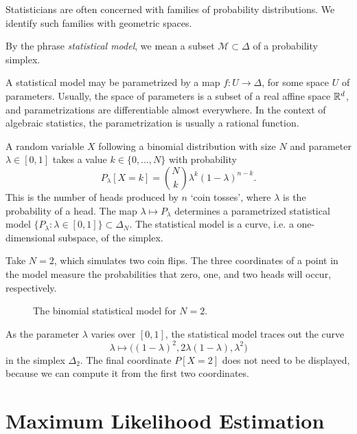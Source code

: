 \documentclass[cclicense]{hmcthesis}
\newcommand*{\Mod}{\mathcal{M}}
\numberwithin{equation}{section}
\begin{document}
    Statisticians are often concerned with families of probability
    distributions.  We identify such families with geometric spaces.
    \begin{definition}
    By the phrase \emph{statistical model}, we mean a subset $\Mod \subset
    \Delta$ of a probability simplex.
    \end{definition}
    \noindent A statistical model may be parametrized by a map $f: U \to
    \Delta$, for some space $U$ of parameters.  Usually, the space of parameters
    is a subset of a real affine space $\mathbb{R}^d$, and parametrizations are
    differentiable almost everywhere.  In the context of algebraic statistics,
    the parametrization is usually a rational function.
    \begin{example}
    A random variable $X$ following a binomial distribution with size $N$ and
    parameter $\lambda \in [0,1]$ takes a value $k \in \{0,\ldots, N\}$ with
    probability
    \[
        P_\lambda[X = k] = {N \choose k} \lambda^k(1-\lambda)^{n-k}.
    \]
    This is the number of heads produced by $n$ `coin tosses', where $\lambda$
    is the probability of a head.  The map $\lambda \mapsto P_\lambda$
    determines a parametrized statistical model $\{P_\lambda : \lambda \in [0,1]
    \} \subset \Delta_N$. The statistical model is a curve, i.e. a
    one-dimensional subspace, of the simplex.  

    Take $N=2$, which simulates two coin flips.  The three coordinates of a
    point in the model measure the probabilities that zero, one, and two heads
    will occur, respectively.
    \begin{figure}[H]\label{fig:binomial}
        \centering
        \vspace*{-0.2cm}
        \vspace*{-0.5cm}
        \caption{The binomial statistical model for $N=2$.}
    \end{figure}
    \noindent As the parameter $\lambda$ varies over $[0,1]$, the statistical
    model traces out the curve 
    \[
        \lambda \longmapsto \big((1-\lambda)^2, 2\lambda(1-\lambda), \lambda^2\big)
    \]
    in the simplex $\Delta_2$.  The final coordinate
    $P[X=2]$ does not need to be displayed, because we can compute it from the
    first two coordinates.  
    \end{example}
    
\section{Maximum Likelihood Estimation}
\end{document}
